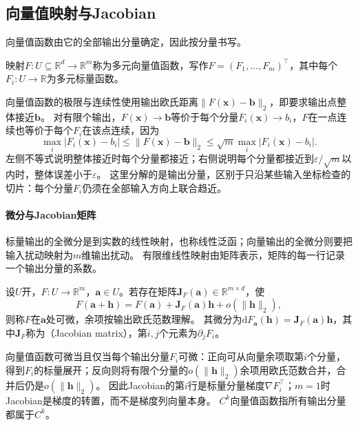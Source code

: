 \subsection{向量值映射与Jacobian}

向量值函数由它的全部输出分量确定，因此按分量书写。
\begin{definition}[多元向量值函数]
\label{def:multivariable-vector-function}
映射$F:U\subseteq\mathbb R^d\to\mathbb R^m$称为多元向量值函数，写作$F=(F_1,\ldots,F_m)^\top$，其中每个$F_i:U\to\mathbb R$为多元标量函数。
\end{definition}
向量值函数的极限与连续性使用输出欧氏距离$\lVert F(\bm x)-\bm b\rVert_2$，即要求输出点整体接近$\bm b$。
对有限个输出，$F(\bm x)\to\bm b$等价于每个分量$F_i(\bm x)\to b_i$，$F$在一点连续也等价于每个$F_i$在该点连续，因为
\[
 \max_i|F_i(\bm x)-b_i|\leq\lVert F(\bm x)-\bm b\rVert_2
 \leq\sqrt m\max_i|F_i(\bm x)-b_i|.
\]
左侧不等式说明整体接近时每个分量都接近；右侧说明每个分量都接近到$\varepsilon/\sqrt m$以内时，整体误差小于$\varepsilon$。
这里分解的是输出分量，区别于只沿某些输入坐标检查的切片：每个分量$F_i$仍须在全部输入方向上联合趋近。

\paragraph{微分与Jacobian矩阵}

标量输出的全微分是到实数的线性映射，也称线性泛函；向量输出的全微分则要把输入扰动映射为$m$维输出扰动。
有限维线性映射由矩阵表示，矩阵的每一行记录一个输出分量的系数。
\begin{definition}[向量值函数的微分]
\label{def:multivariable-vector-differential}
设$U$开，$F:U\to\mathbb R^m$，$\bm a\in U$。若存在矩阵$\bm J_F(\bm a)\in\mathbb R^{m\times d}$，使
\begin{equation}
 F(\bm a+\bm h)=F(\bm a)+\bm J_F(\bm a)\bm h+o(\lVert\bm h\rVert_2),
\label{eq:analysis-jacobian-linearization}
\end{equation}
则称$F$在$\bm a$处可微，余项按输出欧氏范数理解。
其微分为$\mathrm dF_{\bm a}(\bm h)=\bm J_F(\bm a)\bm h$，其中$\bm J_F$称为（Jacobian matrix），第$i,j$个元素为$\partial_jF_i$。
\end{definition}
向量值函数可微当且仅当每个输出分量$F_i$可微：正向可从向量余项取第$i$个分量，得到$F_i$的标量展开；反向则将有限个分量的$o(\lVert\bm h\rVert_2)$余项用欧氏范数合并，合并后仍是$o(\lVert\bm h\rVert_2)$。
因此Jacobian的第$i$行是标量分量梯度$\nabla F_i^\top$；$m=1$时Jacobian是梯度的转置，而不是梯度列向量本身。
$C^k$向量值函数指所有输出分量都属于$C^k$。

